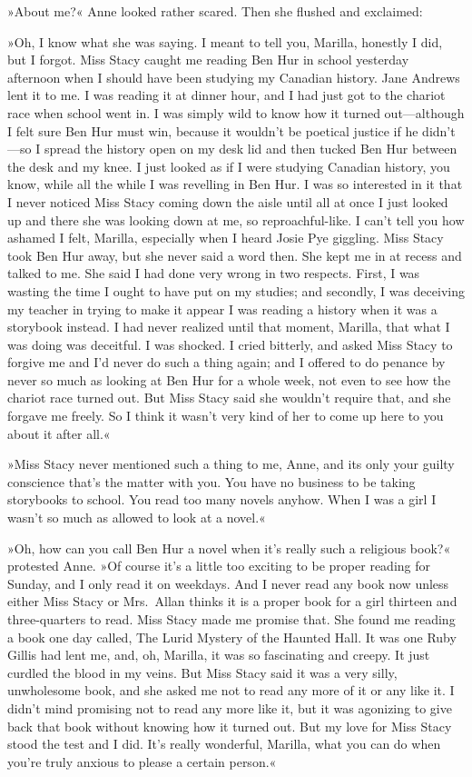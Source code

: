 »About me?« Anne looked rather scared. Then she flushed and exclaimed:

»Oh, I know what she was saying. I meant to tell you, Marilla, honestly I did, but I forgot. Miss Stacy caught me reading Ben Hur in school yesterday afternoon when I should have been studying my Canadian history. Jane Andrews lent it to me. I was reading it at dinner hour, and I had just got to the chariot race when school went in. I was simply wild to know how it turned out—although I felt sure Ben Hur must win, because it wouldn't be poetical justice if he didn't—so I spread the history open on my desk lid and then tucked Ben Hur between the desk and my knee. I just looked as if I were studying Canadian history, you know, while all the while I was revelling in Ben Hur. I was so interested in it that I never noticed Miss Stacy coming down the aisle until all at once I just looked up and there she was looking down at me, so reproachful-like. I can't tell you how ashamed I felt, Marilla, especially when I heard Josie Pye giggling. Miss Stacy took Ben Hur away, but she never said a word then. She kept me in at recess and talked to me. She said I had done very wrong in two respects. First, I was wasting the time I ought to have put on my studies; and secondly, I was deceiving my teacher in trying to make it appear I was reading a history when it was a storybook instead. I had never realized until that moment, Marilla, that what I was doing was deceitful. I was shocked. I cried bitterly, and asked Miss Stacy to forgive me and I'd never do such a thing again; and I offered to do penance by never so much as looking at Ben Hur for a whole week, not even to see how the chariot race turned out. But Miss Stacy said she wouldn't require that, and she forgave me freely. So I think it wasn't very kind of her to come up here to you about it after all.«

»Miss Stacy never mentioned such a thing to me, Anne, and its only your guilty conscience that's the matter with you. You have no business to be taking storybooks to school. You read too many novels anyhow. When I was a girl I wasn't so much as allowed to look at a novel.«

»Oh, how can you call Ben Hur a novel when it's really such a religious book?« protested Anne. »Of course it's a little too exciting to be proper reading for Sunday, and I only read it on weekdays. And I never read any book now unless either Miss Stacy or Mrs.~Allan thinks it is a proper book for a girl thirteen and three-quarters to read. Miss Stacy made me promise that. She found me reading a book one day called, The Lurid Mystery of the Haunted Hall. It was one Ruby Gillis had lent me, and, oh, Marilla, it was so fascinating and creepy. It just curdled the blood in my veins. But Miss Stacy said it was a very silly, unwholesome book, and she asked me not to read any more of it or any like it. I didn't mind promising not to read any more like it, but it was agonizing to give back that book without knowing how it turned out. But my love for Miss Stacy stood the test and I did. It's really wonderful, Marilla, what you can do when you're truly anxious to please a certain person.«

